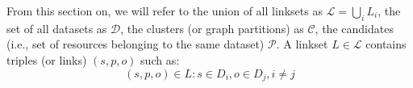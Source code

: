 
From this section on, we will refer to the union of all linksets as $\mathcal{L} = \bigcup_i L_i$, the set of all datasets as $\mathcal{D}$, the clusters (or graph partitions) as $\mathcal{C}$, the candidates (i.e., set of resources belonging to the same dataset) $\mathcal{P}$.
A linkset $L \in \mathcal{L}$ contains triples (or links) $(s,p,o)$ such as:
\begin{equation} \label{eq:linkset}
(s,p,o) \in L : s \in D_i, o \in D_j, i \neq j
\end{equation}

